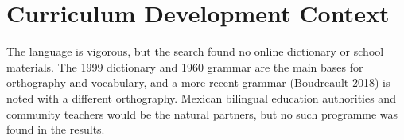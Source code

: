 \documentclass[12pt]{article}
\begin{document}
\section{Curriculum Development Context}
The language is vigorous, but the search found no online dictionary or school materials. The 1999 dictionary and 1960 grammar are the main bases for orthography and vocabulary, and a more recent grammar (Boudreault 2018) is noted with a different orthography. Mexican bilingual education authorities and community teachers would be the natural partners, but no such programme was found in the results.
\end{document}
